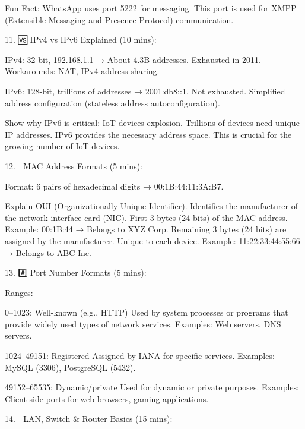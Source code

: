         Fun Fact: WhatsApp uses port 5222 for messaging.
            This port is used for XMPP (Extensible Messaging and Presence Protocol) communication.
                


    11. 🆚 IPv4 vs IPv6 Explained (10 mins):

        IPv4: 32-bit, 192.168.1.1 → About 4.3B addresses.
            Exhausted in 2011.
            Workarounds: NAT, IPv4 address sharing.


        IPv6: 128-bit, trillions of addresses → 2001:db8::1.
            Not exhausted.
            Simplified address configuration (stateless address autoconfiguration).


        Show why IPv6 is critical: IoT devices explosion.
            Trillions of devices need unique IP addresses.
            IPv6 provides the necessary address space.
            This is crucial for the growing number of IoT devices.




    12. 🪪 MAC Address Formats (5 mins):

        Format: 6 pairs of hexadecimal digits → 00:1B:44:11:3A:B7.


        Explain OUI (Organizationally Unique Identifier).
            Identifies the manufacturer of the network interface card (NIC).
            First 3 bytes (24 bits) of the MAC address.
            Example: 00:1B:44 → Belongs to XYZ Corp.
            Remaining 3 bytes (24 bits) are assigned by the manufacturer.
            Unique to each device.
            Example: 11:22:33:44:55:66 → Belongs to ABC Inc.




    13. #️⃣ Port Number Formats (5 mins):

        Ranges:

            0–1023: Well-known (e.g., HTTP)
                Used by system processes or programs that provide widely used types of network services.
                Examples: Web servers, DNS servers.


            1024–49151: Registered
                Assigned by IANA for specific services.
                Examples: MySQL (3306), PostgreSQL (5432).

            49152–65535: Dynamic/private
                Used for dynamic or private purposes.
                Examples: Client-side ports for web browsers, gaming applications.

    14. 📶 LAN, Switch & Router Basics (15 mins):

